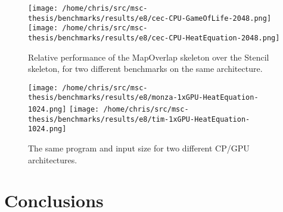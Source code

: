 \begin{figure}
\texttt{[image: /home/chris/src/msc-thesis/benchmarks/results/e8/cec-CPU-GameOfLife-2048.png]}
\texttt{[image: /home/chris/src/msc-thesis/benchmarks/results/e8/cec-CPU-HeatEquation-2048.png]}
\caption{%
  Relative performance of the MapOverlap skeleton over the Stencil
  skeleton, for two different benchmarks on the same architecture.%
}
\end{figure}

\begin{figure}
\texttt{[image: /home/chris/src/msc-thesis/benchmarks/results/e8/monza-1xGPU-HeatEquation-1024.png]}
\texttt{[image: /home/chris/src/msc-thesis/benchmarks/results/e8/tim-1xGPU-HeatEquation-1024.png]}
\caption{%
  The same program and input size for two different CP/GPU
  architectures.%
}
\end{figure}


\section{Conclusions}

